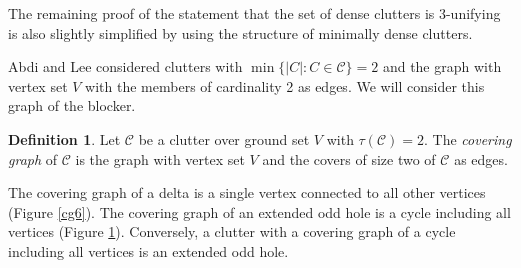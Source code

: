 \documentclass[a4paper, 12pt, twoside=false]{scrbook}
\theoremstyle{definition}
\newtheorem*{definition}{Definition}
\begin{document}
The remaining proof of the statement that the set of dense clutters is 3-unifying is also slightly simplified by using the structure of minimally dense clutters.
\newline

Abdi and Lee considered clutters with $\min\{|C|:C\in \mathcal{C}\}=2$ and the graph with vertex set $V$ with the members of cardinality 2 as edges\cite{deltas}. We will consider this graph of the blocker.

   \begin{definition}
       Let $\mathcal{C}$ be a clutter over ground set $V$ with $\tau(\mathcal{C})=2$.
       The \emph{covering graph} of $\mathcal{C}$ is the graph with vertex set $V$ and the covers of size two of $\mathcal{C}$ as edges.
   \end{definition}
   The covering graph of a delta is a single vertex connected to all other vertices (Figure \ref*{cg6}).
   The covering graph of an extended odd hole is a cycle including all vertices (Figure \ref*{cg5}). Conversely, a clutter with a covering graph of a cycle including all vertices is an extended odd hole.

    \begin{figure}[h]
        \centering
        \begin{minipage}{.4\textwidth}
            \centering
            \label{cg6}
        \end{minipage}
        \begin{minipage}{.5\textwidth}
            \centering
            \label{cg5}
        \end{minipage}
    \end{figure}
\end{document}
